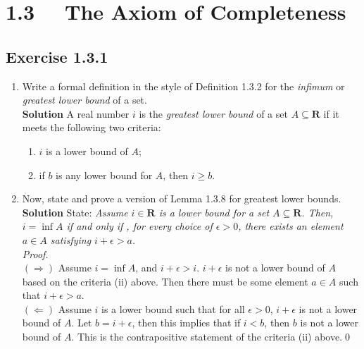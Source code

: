 \documentclass[12pt]{report}
\begin{document}
\section{1.3 ~~The Axiom of Completeness}
\subsection*{Exercise 1.3.1}
\begin{enumerate}[label=(\alph*)]
    \item Write a formal definition in the style of Definition 1.3.2 for the \textit{infimum} or \textit{greatest lower bound} of a set.\\
    \textbf{Solution} A real number $i$ is the \textit{greatest lower bound} of a set $A \subseteq \mathbf{R}$ if it meets the following two criteria:
    \begin{enumerate}[label=(\roman*)]
        \item $i$ is a lower bound of $A$;
        \item if $b$ is any lower bound for $A$, then $i \geq b$.
    \end{enumerate}
    \item Now, state and prove a version of Lemma 1.3.8 for greatest lower bounds.\\
    \textbf{Solution} State: \textit{Assume $i \in \mathbf{R}$ is a lower bound for a set $A\subseteq\mathbf{R}$. Then, $i = \inf A$ if and only if , for every choice of $\epsilon >0$, there exists an element $a \in A$ satisfying $i+\epsilon >a$.}\\
    \textit{Proof.}\\
    $(\Rightarrow)$ Assume $i = \inf A$, and $i+\epsilon >i$. $i+\epsilon$ is not a lower bound of $A$ based on the criteria (ii) above. Then there must be some element $a \in A$ such that $i+\epsilon >a$.\\
    $(\Leftarrow)$ Assume $i$ is a lower bound such that for all $\epsilon>0$, $i+\epsilon$ is not a lower bound of $A$. Let $b = i +\epsilon$, then this implies that if $i<b$, then $b$ is not a lower bound of $A$. This is the contrapositive statement of the criteria (ii) above.\qed
\end{enumerate}
\end{document}
